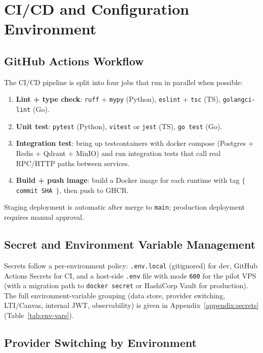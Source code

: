 \section{CI/CD and Configuration Environment}
\label{sec:cicd-impl}

\subsection{GitHub Actions Workflow}

The CI/CD pipeline is split into four jobs that run in parallel when
possible:

\begin{enumerate}
    \item \textbf{Lint + type check}: \texttt{ruff} + \texttt{mypy}
          (Python), \texttt{eslint} + \texttt{tsc} (TS),
          \texttt{golangci-lint} (Go).
    \item \textbf{Unit test}: \texttt{pytest} (Python),
          \texttt{vitest} or \texttt{jest} (TS), \texttt{go test} (Go).
    \item \textbf{Integration test}: bring up testcontainers with
          docker compose (Postgres + Redis + Qdrant + MinIO) and run
          integration tests that call real RPC/HTTP paths between
          services.
    \item \textbf{Build + push image}: build a Docker image for each
          runtime with tag \texttt{$\{$ commit SHA $\}$}, then push to
          GHCR.
\end{enumerate}

Staging deployment is automatic after merge to \texttt{main}; production
deployment requires manual approval.

\subsection{Secret and Environment Variable Management}

Secrets follow a per-environment policy: \texttt{.env.local}
(gitignored) for dev, GitHub Actions Secrets for CI, and a host-side
\texttt{.env} file with mode \texttt{600} for the pilot VPS (with a
migration path to \texttt{docker secret} or HashiCorp Vault for
production). The full environment-variable grouping (data store,
provider switching, LTI/Canvas, internal JWT, observability) is given
in Appendix~\ref{appendix:secrets} (Table~\ref{tab:env-vars}).

\subsection{Provider Switching by Environment}

